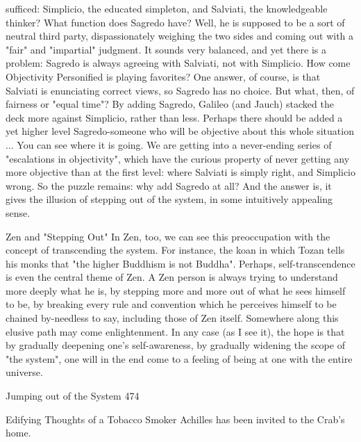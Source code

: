 {sufficed: Simplicio, the educated simpleton, and Salviati, the knowledgeable thinker?
What function does Sagredo have? Well, he is supposed to be a sort of neutral third party,
dispassionately weighing the two sides and coming out with a "fair" and "impartial"
judgment. It sounds very balanced, and yet there is a problem: Sagredo is always
agreeing with Salviati, not with Simplicio. How come Objectivity Personified is playing
favorites? One answer, of course, is that Salviati is enunciating correct views, so Sagredo
has no choice. But what, then, of fairness or "equal time"?
        By adding Sagredo, Galileo (and Jauch) stacked the deck more against Simplicio,
rather than less. Perhaps there should be added a yet higher level Sagredo-someone who
will be objective about this whole situation ... You can see where it is going. We are
getting into a never-ending series of "escalations in objectivity", which have the curious
property of never getting any more objective than at the first level: where Salviati is
simply right, and Simplicio wrong. So the puzzle remains: why add Sagredo at all? And
the answer is, it gives the illusion of stepping out of the system, in some intuitively
appealing sense.

                             Zen and "Stepping Out"
In Zen, too, we can see this preoccupation with the concept of transcending the system.
For instance, the koan in which Tozan tells his monks that "the higher Buddhism is not
Buddha". Perhaps, self-transcendence is even the central theme of Zen. A Zen person is
always trying to understand more deeply what he is, by stepping more and more out of
what he sees himself to be, by breaking every rule and convention which he perceives
himself to be chained by-needless to say, including those of Zen itself. Somewhere along
this elusive path may come enlightenment. In any case (as I see it), the hope is that by
gradually deepening one's self-awareness, by gradually widening the scope of "the
system", one will in the end come to a feeling of being at one with the entire universe.




Jumping out of the System                                                              474

                            Edifying Thoughts
                           of a Tobacco Smoker
                     Achilles has been invited to the Crab's home.

}
